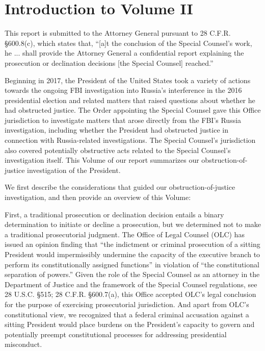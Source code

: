 \section*{Introduction to Volume II}
\label{sec:introduction}

This report is submitted to the Attorney General pursuant to 28 C.F.R. \S 600.8(c), which states that, “[a]t the conclusion of the Special Counsel’s work, he ... shall provide the Attorney General a confidential report explaining the prosecution or declination decisions [the Special Counsel] reached.”

Beginning in 2017, the President of the United States took a variety of actions towards the ongoing FBI investigation into Russia’s interference in the 2016 presidential election and related matters that raised questions about whether he had obstructed justice. 
The Order appointing the Special Counsel gave this Office jurisdiction to investigate matters that arose directly from the FBI’s Russia investigation, including whether the President had obstructed justice in connection with Russia-related investigations. 
The Special Counsel’s jurisdiction also covered potentially obstructive acts related to the Special Counsel’s investigation itself. 
This Volume of our report summarizes our obstruction-of-justice investigation of the President.

We first describe the considerations that guided our obstruction-of-justice investigation, and then provide an overview of this Volume:

First, a traditional prosecution or declination decision entails a binary determination to initiate or decline a prosecution, but we determined not to make a traditional prosecutorial judgment. 
The Office of Legal Counsel (OLC) has issued an opinion finding that “the indictment or criminal prosecution of a sitting President would impermissibly undermine the capacity of the executive branch to perform its constitutionally assigned functions” in violation of “the constitutional separation of powers.”%
Given the role of the Special Counsel as an attorney in the Department of Justice and the framework of the Special Counsel regulations, see 28 U.S.C. \S 515; 28 C.F.R. \S 600.7(a), this Office accepted OLC’s legal conclusion for the purpose of exercising prosecutorial jurisdiction. 
And apart from OLC’s constitutional view, we recognized that a federal criminal accusation against a sitting President would place burdens on the President’s capacity to govern and potentially preempt constitutional processes for addressing presidential misconduct.%

